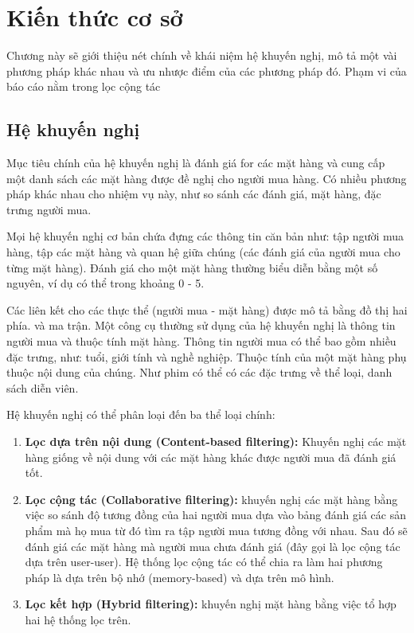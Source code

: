 \chapter{Kiến thức cơ sở}
Chương này sẽ giới thiệu nét chính về khái niệm hệ khuyến nghị, mô tả một vài phương pháp khác nhau và ưu nhược điểm của các phương pháp đó. Phạm vi của báo cáo nằm trong lọc cộng tác

\section{Hệ khuyến nghị}
Mục tiêu chính của hệ khuyến nghị là đánh giá for các mặt hàng và cung cấp một danh sách các mặt hàng được đề nghị cho người mua hàng. Có nhiều phương pháp khác nhau cho nhiệm vụ này, như so sánh các đánh giá, mặt hàng, đặc trưng người mua.

Mọi hệ khuyến nghị cơ bản chứa đựng các thông tin căn bản như: tập người mua hàng, tập các mặt hàng và quan hệ giữa chúng (các đánh giá của người mua cho từng mặt hàng). Đánh giá cho một mặt hàng thường biểu diễn bằng một số nguyên, ví dụ có thể trong khoảng 0 - 5.

Các liên kết cho các thực thể (người mua - mặt hàng) được mô tả bằng đồ thị hai phía. và ma trận. Một công cụ thường sử dụng của hệ khuyến nghị là thông tin người mua và thuộc tính mặt hàng. Thông tin người mua có thể bao gồm nhiều đặc trưng, như: tuổi, giới tính và nghề nghiệp. Thuộc tính của một mặt hàng phụ thuộc nội dung của chúng. Như phim có thể có các đặc trưng về thể loại, danh sách diễn viên.

Hệ khuyến nghị có thể phân loại đến ba thể loại chính:
\begin{enumerate}[1.]
	\item \textbf{Lọc dựa trên nội dung (Content-based filtering):} Khuyến nghị các mặt hàng giống về nội dung với các mặt hàng khác được người mua đã đánh giá tốt.
	\item \textbf{Lọc cộng tác (Collaborative filtering):} khuyến nghị các mặt hàng bằng việc so sánh độ tương đồng của hai người mua dựa vào bảng đánh giá các sản phẩm mà họ mua từ đó tìm ra tập người mua tương đồng với nhau. Sau đó sẽ đánh giá các mặt hàng mà người mua chưa đánh giá (đây gọi là lọc cộng tác dựa trên user-user). Hệ thống lọc cộng tác có thể chia ra làm hai phương pháp là dựa trên bộ nhớ (memory-based) và  dựa trên mô hình.
	\item \textbf{Lọc kết hợp (Hybrid filtering):} khuyến nghị mặt hàng bằng việc tổ hợp hai hệ thống lọc trên.
\end{enumerate}

